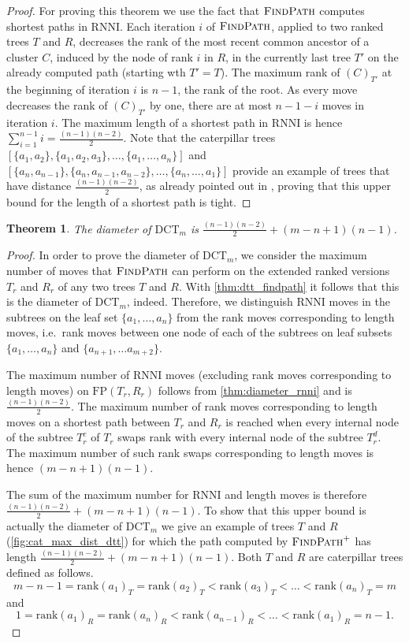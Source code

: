 \documentclass[11pt]{amsart}
\newtheorem{theorem}{Theorem}
\newcommand{\rnni}{\mathrm{RNNI}}
\newcommand{\findpath}{\textsc{FindPath}}
\newcommand{\rank}{\mathrm{rank}}
\newcommand{\fp}{\mathrm{FP}}
\newcommand{\dct}{\mathrm{DCT}}
\begin{document}
\begin{proof}
	For proving this theorem we use the fact that $\findpath$ computes shortest paths in $\rnni$.
	Each iteration $i$ of $\findpath$, applied to two ranked trees $T$ and $R$, decreases the rank of the most recent common ancestor of a cluster $C$, induced by the node of rank $i$ in $R$, in the currently last tree $T'$ on the already computed path (starting wth $T' = T$).
	The maximum rank of $(C)_{T'}$ at the beginning of iteration $i$ is $n-1$, the rank of the root.
	As every move decreases the rank of $(C)_{T'}$ by one, there are at most $n-1-i$ moves in iteration $i$.
	The maximum length of a shortest path in $\rnni$ is hence $\sum \limits_{i = 1}^{n-1} i = \frac{(n-1)(n-2)}{2}$.
	Note that the caterpillar trees $[\{a_1, a_2\}, \{a_1, a_2, a_3\}, \ldots, \{a_1, \ldots, a_n\}]$ and $[\{a_n, a_{n-1}\}, \{a_n, a_{n-1}, a_{n-2}\}, \ldots, \{a_n, \ldots, a_1\}]$ provide an example of trees that have distance $\frac{(n-1)(n-2)}{2}$, as already pointed out in \autocite[Corollary 1]{Collienne2021}, proving that this upper bound for the length of a shortest path is tight.
\end{proof}

\begin{theorem}
	The diameter of $\dct_m$ is $\frac{(n-1)(n-2)}{2} + (m-n+1)(n-1)$.
	\label{thm:dtt_diameter}
\end{theorem}

\begin{proof}
	In order to prove the diameter of $\dct_m$, we consider the maximum number of moves that $\findpath$ can perform on the extended ranked versions $T_r$ and $R_r$ of any two trees $T$ and $R$.
	With \autoref{thm:dtt_findpath} it follows that this is the diameter of $\dct_m$, indeed.
	Therefore, we distinguish $\rnni$ moves in the subtrees on the leaf set $\{a_1, \ldots, a_n\}$ from the rank moves corresponding to length moves, i.e.\ rank moves between one node of each of the subtrees on leaf subsets $\{a_1, \ldots, a_n\}$ and $\{a_{n+1}, \ldots a_{m+2}\}$.

	The maximum number of $\rnni$ moves (excluding rank moves corresponding to length moves) on $\fp(T_r,R_r)$ follows from \autoref{thm:diameter_rnni} and is $\frac{(n-1)(n-2)}{2}$.
	The maximum number of rank moves corresponding to length moves on a shortest path between $T_r$ and $R_r$ is reached when every internal node of the subtree $T_r^c$ of $T_r$ swaps rank with every internal node of the subtree $T_r^d$.
	The maximum number of such rank swaps corresponding to length moves is hence $(m-n+1)(n-1)$.

	The sum of the maximum number for $\rnni$ and length moves is therefore $\frac{(n-1)(n-2)}{2} + (m-n+1)(n-1)$.
	To show that this upper bound is actually the diameter of $\dct_m$ we give an example of trees $T$ and $R$ (\autoref{fig:cat_max_dist_dtt}) for which the path computed by $\findpath^+$ has length $\frac{(n-1)(n-2)}{2} + (m-n+1)(n-1)$.
	Both $T$ and $R$ are caterpillar trees defined as follows.
	\[m-n-1 = \rank(a_1)_T = \rank(a_2)_T < \rank(a_3)_T < \ldots < \rank(a_n)_T = m\]
	and
	\[1 = \rank(a_1)_R = \rank(a_n)_R < \rank(a_{n-1})_R < \ldots < \rank(a_1)_R = n-1.\]
\end{proof}
\end{document}
